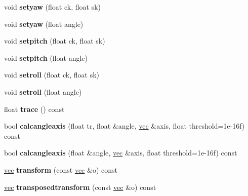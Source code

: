 \begin{DoxyCompactItemize}
\item 
\mbox{\label{structmatrix3_a040489a7e1da0f872363608f7da68d58}} 
void {\bfseries setyaw} (float ck, float sk)
\item 
\mbox{\label{structmatrix3_ac48dbf8d8d6a8cbead923c296f413316}} 
void {\bfseries setyaw} (float angle)
\item 
\mbox{\label{structmatrix3_adc78af871c046fa6bbe0c81aa5f05c54}} 
void {\bfseries setpitch} (float ck, float sk)
\item 
\mbox{\label{structmatrix3_a586e2b39cc6bb9ffe58689f18fadedd7}} 
void {\bfseries setpitch} (float angle)
\item 
\mbox{\label{structmatrix3_a28e7049cc4fad707a86f5e87bda603ba}} 
void {\bfseries setroll} (float ck, float sk)
\item 
\mbox{\label{structmatrix3_aee8be8e464e5aaf443db6cb525fcd551}} 
void {\bfseries setroll} (float angle)
\item 
\mbox{\label{structmatrix3_a84eaa28f72320d029973f052a1f3b7dd}} 
float {\bfseries trace} () const
\item 
\mbox{\label{structmatrix3_a13c3402c3805055422ddbcd7bd7cbd5e}} 
bool {\bfseries calcangleaxis} (float tr, float \&angle, \hyperlink{structvec}{vec} \&axis, float threshold=1e-\/16f) const
\item 
\mbox{\label{structmatrix3_a9341f59191df2d1dfdd436d04ccb900e}} 
bool {\bfseries calcangleaxis} (float \&angle, \hyperlink{structvec}{vec} \&axis, float threshold=1e-\/16f) const
\item 
\mbox{\label{structmatrix3_a58452d12508596c22554aa1b2d894f0d}} 
\hyperlink{structvec}{vec} {\bfseries transform} (const \hyperlink{structvec}{vec} \&o) const
\item 
\mbox{\label{structmatrix3_ad80c0868a7fd8239d25853969d888074}} 
\hyperlink{structvec}{vec} {\bfseries transposedtransform} (const \hyperlink{structvec}{vec} \&o) const

\end{DoxyCompactItemize}
